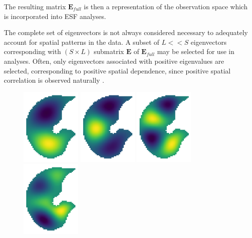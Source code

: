 \documentclass[12pt]{article}
\begin{document}
The resulting matrix $\mathbf{E}_{full}$ is then a representation of the observation space which is incorporated into ESF analyses.

The complete set of eigenvectors is not always considered necessary to adequately account for spatial patterns in the data. A subset of $L<<S$ eigenvectors corresponding with $(S\times L)$ submatrix $\mathbf{E}$ of $\mathbf{E}_{full}$ may be selected for use in analyses. Often, only eigenvectors associated with positive eigenvalues are selected, corresponding to positive spatial dependence, since positive spatial correlation is observed naturally \citep{griffith2014spatial, griffith2006spatial, chun2014quality}. 


\begin{figure}
\centering 
\includegraphics[height=1.5in]{EV1}
\includegraphics[height=1.5in]{EV2}
\includegraphics[height=1.5in]{EV3}
\includegraphics[height=1.5in]{EV4}\\ 


\end{figure}
\end{document}
